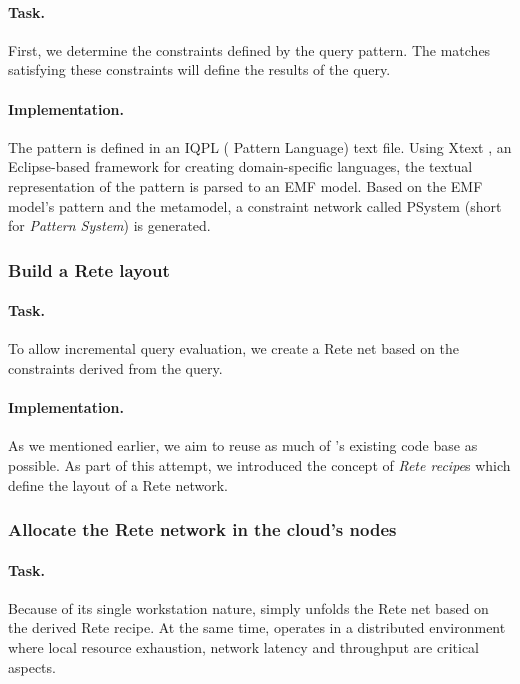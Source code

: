 \paragraph{Task.} First, we determine the constraints defined by the query pattern. The matches satisfying these constraints will define the results of the query.

\paragraph{Implementation.} The pattern is defined in an IQPL (\iq{} Pattern Language) text file. Using Xtext \cite{Xtext}, an Eclipse-based framework for creating domain-specific languages, the textual representation of the pattern is parsed to an EMF model. Based on the EMF model's pattern and the metamodel, a constraint network called PSystem (short for \textit{Pattern System}) is generated. 

\subsubsection{Build a Rete layout}

\paragraph{Task.} To allow incremental query evaluation, we create a Rete net based on the constraints derived from the query.

\paragraph{Implementation.} As we mentioned earlier, we aim to reuse as much of \eiq{}'s existing code base as possible. As part of this attempt, we introduced the concept of \textit{Rete recipe}s which define the layout of a Rete network.    

\subsubsection{Allocate the Rete network in the cloud's nodes} 

\paragraph{Task.} Because of its single workstation nature, \eiq{} simply unfolds the Rete net based on the derived Rete recipe. At the same time, \iqd{} operates in a distributed environment where local resource exhaustion, network latency and throughput are critical aspects. 

